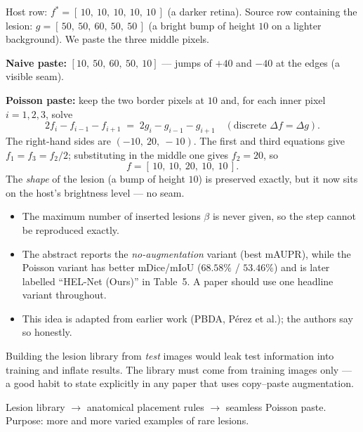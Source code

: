 \documentclass[11pt,a4paper]{article}
\begin{document}
\begin{worked}
Host row: $f^*=[\,10,\ 10,\ 10,\ 10,\ 10\,]$ (a darker retina). Source row containing the lesion:
$g=[\,50,\ 50,\ 60,\ 50,\ 50\,]$ (a bright bump of height $10$ on a lighter background). We paste the
three middle pixels.

\textbf{Naive paste:} $[10,\ 50,\ 60,\ 50,\ 10]$ --- jumps of $+40$ and $-40$ at the edges (a visible seam).

\textbf{Poisson paste:} keep the two border pixels at $10$ and, for each inner pixel $i=1,2,3$, solve
\[
2f_i - f_{i-1}-f_{i+1} \;=\; 2g_i-g_{i-1}-g_{i+1}\quad(\text{discrete } \Delta f=\Delta g).
\]
The right-hand sides are $(-10,\ 20,\ -10)$. The first and third equations give $f_1=f_3=f_2/2$;
substituting in the middle one gives $f_2=20$, so
\[
f=[\,10,\ 10,\ 20,\ 10,\ 10\,].
\]
The \emph{shape} of the lesion (a bump of height $10$) is preserved exactly, but it now sits on the
host's brightness level --- no seam.
\end{worked}

\begin{careful}
\begin{itemize}[leftmargin=*]
\item The maximum number of inserted lesions $\beta$ is never given, so the step cannot be reproduced
      exactly.
\item The abstract reports the \emph{no-augmentation} variant (best mAUPR), while the Poisson variant
      has better mDice/mIoU ($68.58\%$ / $53.46\%$) and is later labelled ``HEL-Net (Ours)'' in Table~5.
      A paper should use one headline variant throughout.
\item This idea is adapted from earlier work (PBDA, P\'erez et al.); the authors say so honestly.
\end{itemize}
\end{careful}

\begin{ethics}
Building the lesion library from \emph{test} images would leak test information into training and
inflate results. The library must come from training images only --- a good habit to state
explicitly in any paper that uses copy--paste augmentation.
\end{ethics}

\begin{recap}
Lesion library $\rightarrow$ anatomical placement rules $\rightarrow$ seamless Poisson paste.
Purpose: more and more varied examples of rare lesions.
\end{recap}
\end{document}
